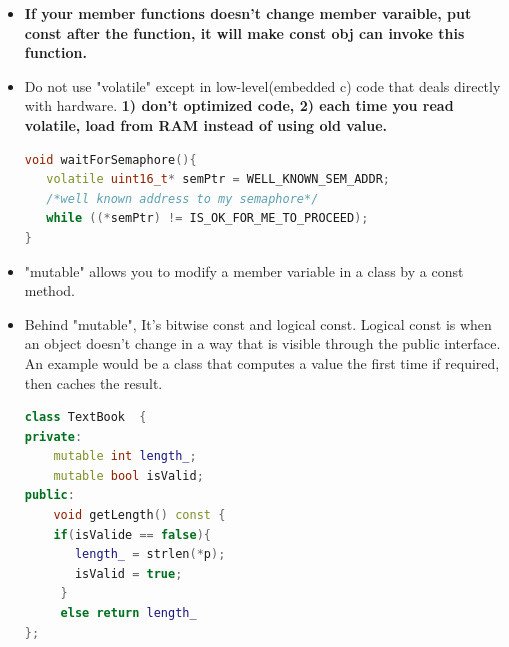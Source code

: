 \documentclass[a4paper,12pt,twoside]{book}
\newcommand{\Hilight}[1]{\makebox[0pt][l]{\color{yellow}\rule[-3pt]{#1em}{11pt}}}
\begin{document}
\begin{itemize}
\begin{enumerate}
\begin{lstlisting}[frame=single, language=c++]
  int age() const;
  // Also right: the caller can't change the Person's age
  // ...
};

void myCode(const Person& p){
 // const p means not to change the Person object
  p.name_evil() = "Igor";  // But changed....!!
}
\end{lstlisting}

\item The most common use of const overloading is with the subscript operator. You should generally try to use one of the standard container templates, such as std::vector, but if you need to create your own class that has a subscript operator, here's the rule of thumb:\textbf{ subscript operators often come in pairs.}
\begin{lstlisting}[frame=single, language=c++, mathescape=true]
class Fred { /*...*/ };
class MyFredList {
public:
  $\Hilight{7}$const Fred& operator[] (unsigned index) const;
  // Subscript operators often come in pairs

  Fred&  operator[] (unsigned index);
  // Subscript operators often come in pairs
};
\end{lstlisting}


\end{enumerate}
\item \textbf{If your member functions doesn't change member varaible, put const after the function, it will make const obj can invoke this function.}

\item Do not use "volatile" except in low-level(embedded c) code that deals directly with hardware. \textbf{1) don't optimized code, 2) each time you read volatile, load from RAM instead of using old value.}
\begin{lstlisting}[frame=single, language=c++]
void waitForSemaphore(){
   volatile uint16_t* semPtr = WELL_KNOWN_SEM_ADDR;
   /*well known address to my semaphore*/
   while ((*semPtr) != IS_OK_FOR_ME_TO_PROCEED);
}
\end{lstlisting}

\item "mutable" allows you to modify a member variable in a class by a const method.

\item Behind "mutable", It's bitwise const and logical const. Logical const is when an object doesn't change in a way that is visible through the public interface. An example would be a class that computes a value the first time if required, then caches the result.
\begin{lstlisting}[frame=single, language=c++]
class TextBook  {
private:
    mutable int length_;
    mutable bool isValid;
public:
    void getLength() const {
    if(isValide == false){
       length_ = strlen(*p);
       isValid = true; 
     }
     else return length_
};
\end{lstlisting}


\end{itemize}
\end{document}
